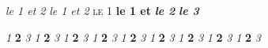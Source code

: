 \documentclass{article}
\begin{document}
\textit{le 1\ier{} et 2} \textsl{le 1\ier{} et 2\ieme} \textsc{le 1\ier} \textbf{le 1\ier{} et }
\textbf{\textit{le 2}} \textbf{\textsl{le 3}}

{\tiny \textit{1\ier} \textbf{2\ieme} \textsl{3}}
{\scriptsize \textit{1\ier} \textbf{2\ieme} \textsl{3}}
{\footnotesize \textit{1\ier} \textbf{2\ieme} \textsl{3}}
{\small \textit{1\ier} \textbf{2\ieme} \textsl{3}}
{\large \textit{1\ier} \textbf{2\ieme} \textsl{3}}
{\Large \textit{1\ier} \textbf{2\ieme} \textsl{3}}
{\LARGE \textit{1\ier} \textbf{2\ieme} \textsl{3}}
{\huge \textit{1\ier} \textbf{2\ieme} \textsl{3}}
{\Huge \textit{1\ier} \textbf{2\ieme} \textsl{3}}
\end{document}

